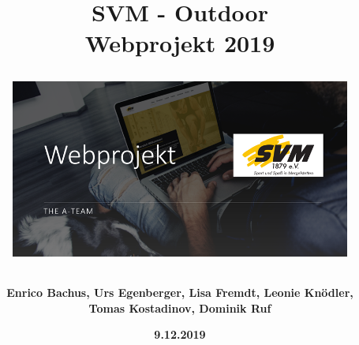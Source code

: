 \documentclass[12pt,a4paper]{article}
\begin{document}
\begin{titlepage}
\title{\vspace*{1cm} \huge{\textbf{SVM - Outdoor}} \\ \textbf{Webprojekt 2019}\\
\vspace*{2cm}
\begin{figure}[htb]
\advance\leftskip-2cm
\includegraphics[scale=1.2]{Startseite.png}
\end{figure}
\vspace{2cm}}
\author{\textbf{Enrico Bachus, Urs Egenberger, Lisa Fremdt, Leonie Knödler,}\\ \textbf{Tomas Kostadinov, Dominik Ruf}}
\date{\vspace{2cm} \textbf{9.12.2019}}

\end{titlepage}
\maketitle
\newpage
\tableofcontents
\newpage
\end{document}
